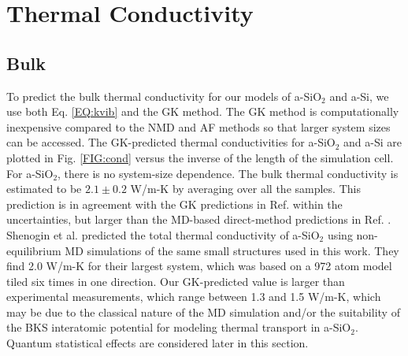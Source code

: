 \documentclass[aps,prb,twocolumn,superscriptaddress,footinbib,amsmath,amssymb,floatfix]{revtex4}
\begin{document}

\section{\label{S:Conductivity}Thermal Conductivity}

\subsection{\label{S:Bulk}Bulk}

To predict the bulk thermal conductivity for our models of a-SiO$_2$ and 
a-Si, we use both Eq. \eqref{EQ:kvib} and the GK method. The GK method 
is computationally inexpensive compared to the NMD and AF methods so that 
larger system sizes can be accessed. The GK-predicted thermal 
conductivities for a-SiO$_2$ and a-Si are plotted in Fig. \ref{FIG:cond} 
versus the inverse of the length of the simulation cell. For a-SiO$_2$, 
there is no system-size dependence.  The bulk thermal conductivity is 
estimated to be $2.1 \pm 0.2$ W/m-K by averaging over all the samples. 
This prediction is in agreement with the GK predictions in Ref. 
 within the uncertainties, 
but larger than the MD-based direct-method predictions in Ref. 
. 
Shenogin et al. predicted the total thermal 
conductivity of a-SiO$_2$ using 
non-equilibrium MD simulations of the same small structures 
used in this work.\cite{shenogin_predicting_2009} 
They find 2.0 W/m-K for their largest system, which was based on a 
972 atom model tiled six times in one direction. 
Our GK-predicted value is larger than experimental 
measurements, which range between 
1.3 and 1.5 W/m-K,
\cite{cahill_lattice_1988,lee_heat_1997,
yamane_measurement_2002,regner_broadband_2013} 
which may be due to the classical nature of the MD simulation 
and/or the suitability of the BKS interatomic potential 
for modeling thermal transport in a-SiO$_2$.
\cite{jund_molecular-dynamics_1999,mcgaughey_thermal_2004}
Quantum statistical effects are considered later in this section. 
\end{document}
